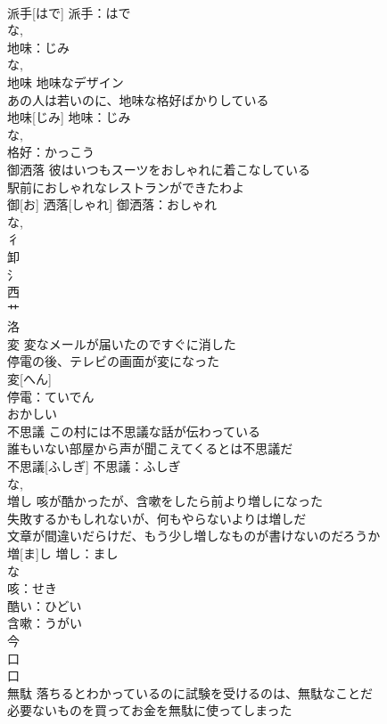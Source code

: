 \documentclass[8pt]{extreport}
\begin{document}
\begin{CJK}{UTF8}{min}
\\	派手[はで]			派手：はで
\\	な, 
\\	地味：じみ
\\	な, 
\\	地味	地味なデザイン 
\\	あの人は若いのに、地味な格好ばかりしている 
\\	地味[じみ]			地味：じみ
\\	な, 
\\	格好：かっこう
\\	御洒落	彼はいつもスーツをおしゃれに着こなしている 
\\	駅前におしゃれなレストランができたわよ 
\\	御[お] 洒落[しゃれ]			御洒落：おしゃれ
\\	な, 
\\	彳 
\\	卸 
\\	氵 
\\	西 
\\	艹 
\\	洛 
\\	変	変なメールが届いたのですぐに消した 
\\	停電の後、テレビの画面が変になった 
\\	変[へん]			
\\	停電：ていでん
\\	おかしい 
\\	不思議	この村には不思議な話が伝わっている 
\\	誰もいない部屋から声が聞こえてくるとは不思議だ 
\\	不思議[ふしぎ]			不思議：ふしぎ
\\	な, 
\\	増し	咳が酷かったが、含嗽をしたら前より増しになった 
\\	失敗するかもしれないが、何もやらないよりは増しだ 
\\	文章が間違いだらけだ、もう少し増しなものが書けないのだろうか 
\\	増[ま]し			増し：まし
\\	な
\\	咳：せき
\\	酷い：ひどい
\\	含嗽：うがい
\\	今 
\\	口 
\\	口 
\\	無駄	落ちるとわかっているのに試験を受けるのは、無駄なことだ 
\\	必要ないものを買ってお金を無駄に使ってしまった 

\end{CJK}
\end{document}
